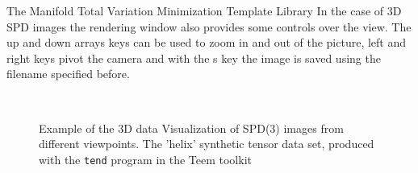 \begin{chapter}{The Manifold Total Variation Minimization Template Library}
In the case of 3D SPD images the rendering window also provides some controls over the view. The up and down arrays keys can be used to zoom in and out of the picture, left and right keys
pivot the camera and with the s key the image is saved using the filename specified before.
\begin{figure}[h!]
    \centering
    \\
    \caption[3D SPD(3) Volume Visualization of a helix]{Example of the 3D data Visualization of SPD(3) images from different viewpoints. The 'helix' synthetic tensor data set, produced with the \texttt{tend} program in the Teem toolkit\cite{teem}
	\label{fig:helix}
    }
\end{figure}

\FloatBarrier

\end{chapter}
